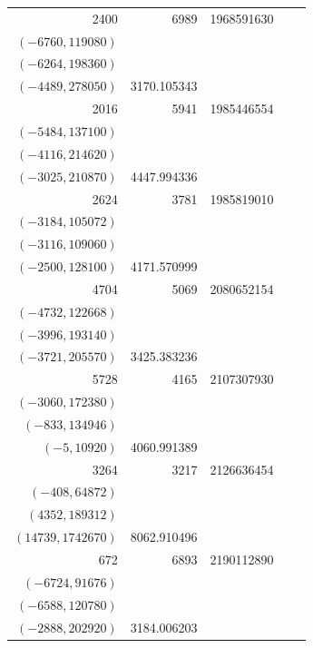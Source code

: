 \documentclass[11pt]{article}
\begin{document}
\begin{longtable}{r r r l r}
2400 & 6989 & 1968591630 & \begin{tabular}[t]{@{}l@{}}$(-6845,95460)$\\$(-6760,119080)$\\$(-6264,198360)$\\$(-4489,278050)$\end{tabular} & 3170.105343\\[5pt]
2016 & 5941 & 1985446554 & \begin{tabular}[t]{@{}l@{}}$(-5832,70632)$\\$(-5484,137100)$\\$(-4116,214620)$\\$(-3025,210870)$\end{tabular} & 4447.994336\\[5pt]
2624 & 3781 & 1985819010 & \begin{tabular}[t]{@{}l@{}}$(-3724,36708)$\\$(-3184,105072)$\\$(-3116,109060)$\\$(-2500,128100)$\end{tabular} & 4171.570999\\[5pt]
4704 & 5069 & 2080652154 & \begin{tabular}[t]{@{}l@{}}$(-4900,89180)$\\$(-4732,122668)$\\$(-3996,193140)$\\$(-3721,205570)$\end{tabular} & 3425.383236\\[5pt]
5728 & 4165 & 2107307930 & \begin{tabular}[t]{@{}l@{}}$(-3580,139620)$\\$(-3060,172380)$\\$(-833,134946)$\\$(-5,10920)$\end{tabular} & 4060.991389\\[5pt]
3264 & 3217 & 2126636454 & \begin{tabular}[t]{@{}l@{}}$(-3136,40320)$\\$(-408,64872)$\\$(4352,189312)$\\$(14739,1742670)$\end{tabular} & 8062.910496\\[5pt]
672 & 6893 & 2190112890 & \begin{tabular}[t]{@{}l@{}}$(-6804,67284)$\\$(-6724,91676)$\\$(-6588,120780)$\\$(-2888,202920)$\end{tabular} & 3184.006203\\[5pt]

\end{longtable}
\end{document}
